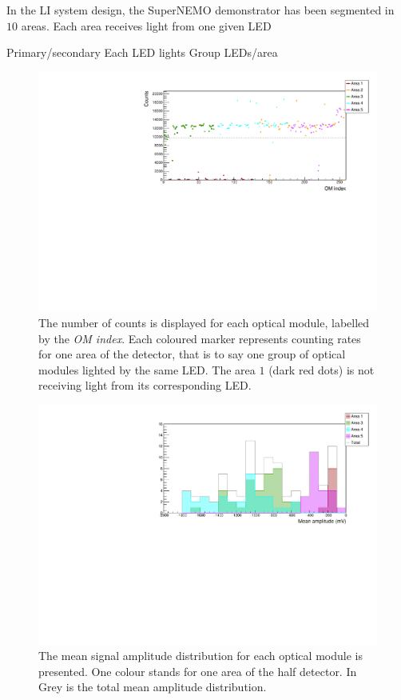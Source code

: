 In the LI system design, the SuperNEMO demonstrator has been segmented in $10$ areas.
Each area receives light from one given LED

Primary/secondary
Each LED lights
Group LEDs/area

\begin{figure}[h]
  \centering
  \includegraphics[width=15cm]{commissioning/fig_commissioning/LI_1d_counts.pdf}
  \caption{The number of counts is displayed for each optical module, labelled by the \emph{OM index}.
    Each coloured marker represents counting rates for one area of the detector, that is to say one group of optical modules lighted by the same LED.
    The area $1$ (dark red dots) is not receiving light from its corresponding LED.
    \label{fig:LI_counts}}
\end{figure}


\begin{figure}[h]
  \centering
  \includegraphics[width=15cm]{commissioning/fig_commissioning/LI_mean_ampl.pdf}
  \caption{The mean signal amplitude distribution for each optical module is presented.
    One colour stands for one area of the half detector.
    In Grey is the total mean amplitude distribution.
    \label{fig:LI_ampl}}
\end{figure}


